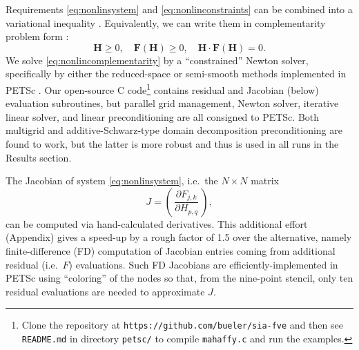 \documentclass[twocolumn,letterpaper]{igs}
\newcommand\bF{\mathbf{F}}
\newcommand\bH{\mathbf{H}}
\begin{document}
Requirements \eqref{eq:nonlinsystem} and \eqref{eq:nonlinconstraints} can be combined into a variational inequality \citep{JouvetBueler2012,KinderlehrerStampacchia1980}.  Equivalently, we can write them in complementarity problem form \citep{BensonMunson2006}:
\begin{equation}
\bH \ge 0, \quad \bF(\bH) \ge 0, \quad \bH \cdot \bF(\bH) = 0.  \label{eq:nonlincomplementarity}
\end{equation}
We solve \eqref{eq:nonlincomplementarity} by a ``constrained'' Newton solver, specifically by either the reduced-space or semi-smooth methods \citep{BensonMunson2006} implemented in PETSc \citep{Balayetal2014}.  Our open-source C code\footnote{Clone the repository at \texttt{https://github.com/bueler/sia-fve} and then see \texttt{README.md} in directory \texttt{petsc/} to compile \texttt{mahaffy.c} and run the examples.} contains residual and Jacobian (below) evaluation subroutines, but parallel grid management, Newton solver, iterative linear solver, and linear preconditioning are all consigned to PETSc.  Both multigrid \citep{Briggsetal2000} and additive-Schwarz-type domain decomposition \citep{Smithetal1996} preconditioning are found to work, but the latter is more robust and thus is used in all runs in the Results section.

The Jacobian of system \eqref{eq:nonlinsystem}, i.e.~the $N\times N$ matrix
\begin{equation}
J = \left(\,\frac{\partial F_{j,k}}{\partial H_{p,q}}\,\right), \label{eq:nonlinjacobian}
\end{equation}
can be computed via hand-calculated derivatives.  This additional effort (Appendix) gives a speed-up by a rough factor of 1.5 over the alternative, namely finite-difference (FD) computation of Jacobian entries coming from additional residual (i.e.~$F$) evaluations.  Such FD Jacobians are efficiently-implemented in PETSc using ``coloring'' of the nodes \citep{CurtisPowellReid1974} so that, from the nine-point stencil, only ten residual evaluations are needed to approximate $J$.
\end{document}
